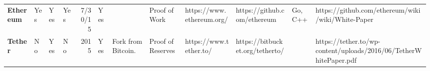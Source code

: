 \begin{table}[ht]
\begin{adjustbox}{width=25cm, height=6cm, angle=270}
\begin{tabular}{llllrlp{17.915em}rlrrr}
      \rowcolor[rgb]{ .267,  .447,  .769} \textcolor[rgb]{ 1,  1,  1}{\textbf{Ethereum}} & \cellcolor[rgb]{ .776,  .937,  .808}\textcolor[rgb]{ 0,  .38,  0}{Yes} & \cellcolor[rgb]{ .776,  .937,  .808}\textcolor[rgb]{ 0,  .38,  0}{Yes} & \cellcolor[rgb]{ .776,  .937,  .808}\textcolor[rgb]{ 0,  .38,  0}{Yes} & \cellcolor[rgb]{ 1,  1,  1}\textcolor[rgb]{ .188,  .329,  .588}{7/30/15} & \cellcolor[rgb]{ .776,  .937,  .808}\textcolor[rgb]{ 0,  .38,  0}{Yes} & \multicolumn{1}{r}{\cellcolor[rgb]{ 1,  1,  1}\textcolor[rgb]{ .188,  .329,  .588}{}} & \multicolumn{1}{l}{\cellcolor[rgb]{ 1,  1,  1}\textcolor[rgb]{ .188,  .329,  .588}{Proof of Work}} & \cellcolor[rgb]{ 1,  1,  1}\textcolor[rgb]{ .188,  .329,  .588}{https://www.ethereum.org/} & \multicolumn{1}{l}{\cellcolor[rgb]{ 1,  1,  1}\textcolor[rgb]{ .188,  .329,  .588}{https://github.com/ethereum}} & \multicolumn{1}{l}{\cellcolor[rgb]{ 1,  1,  1}\textcolor[rgb]{ .188,  .329,  .588}{Go, C++}} & \multicolumn{1}{l}{\cellcolor[rgb]{ 1,  1,  1}\textcolor[rgb]{ .188,  .329,  .588}{https://github.com/ethereum/wiki/wiki/White-Paper}} \\
      \rowcolor[rgb]{ .267,  .447,  .769} \textcolor[rgb]{ 1,  1,  1}{\textbf{Tether}} & \cellcolor[rgb]{ 1,  .78,  .808}\textcolor[rgb]{ .612,  0,  .024}{No} & \cellcolor[rgb]{ .776,  .937,  .808}\textcolor[rgb]{ 0,  .38,  0}{Yes} & \cellcolor[rgb]{ 1,  .78,  .808}\textcolor[rgb]{ .612,  0,  .024}{No} & \cellcolor[rgb]{ .851,  .882,  .949}\textcolor[rgb]{ .188,  .329,  .588}{2015} & \cellcolor[rgb]{ .776,  .937,  .808}\textcolor[rgb]{ 0,  .38,  0}{Yes} & \cellcolor[rgb]{ .851,  .882,  .949}\textcolor[rgb]{ .188,  .329,  .588}{Fork from Bitcoin.} & \multicolumn{1}{l}{\cellcolor[rgb]{ .851,  .882,  .949}\textcolor[rgb]{ .188,  .329,  .588}{Proof of Reserves}} & \cellcolor[rgb]{ .851,  .882,  .949}\textcolor[rgb]{ .02,  .388,  .757}{https://www.tether.to/} & \multicolumn{1}{l}{\cellcolor[rgb]{ .851,  .882,  .949}\textcolor[rgb]{ .188,  .329,  .588}{https://bitbucket.org/tetherto/}} & \cellcolor[rgb]{ .851,  .882,  .949}\textcolor[rgb]{ .188,  .329,  .588}{} & \multicolumn{1}{l}{\cellcolor[rgb]{ .851,  .882,  .949}\textcolor[rgb]{ .188,  .329,  .588}{https://tether.to/wp-content/uploads/2016/06/TetherWhitePaper.pdf}} \\

\end{tabular}
\end{adjustbox}
\end{table}

